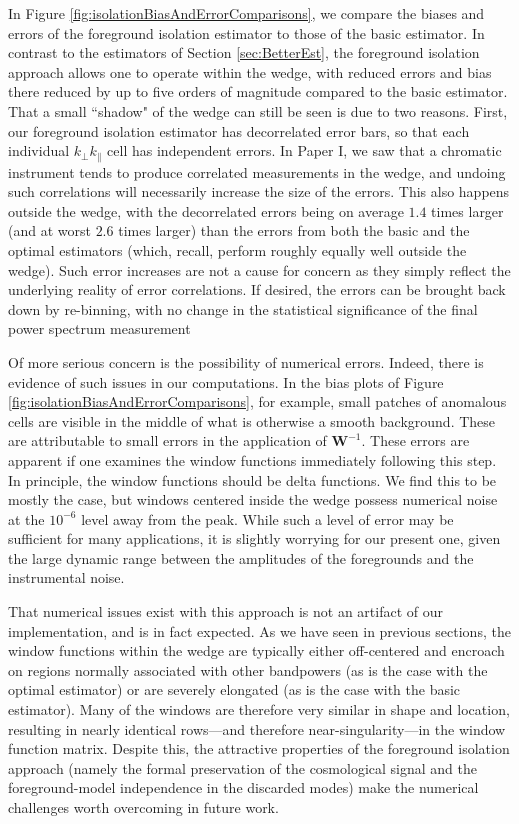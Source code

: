 \documentclass[twocolumn,aps,prd,nofootinbib,showpacs]{revtex4-1}
\begin{document}
In Figure \ref{fig:isolationBiasAndErrorComparisons}, we compare the biases and errors of the foreground isolation estimator to those of the basic estimator.  In contrast to the estimators of Section \ref{sec:BetterEst}, the foreground isolation approach allows one to operate within the wedge, with reduced errors and bias there reduced by up to five orders of magnitude compared to the basic estimator.  That a small ``shadow" of the wedge can still be seen is due to two reasons.  First, our foreground isolation estimator has decorrelated error bars, so that each individual $k_\perp k_\parallel$ cell has independent errors.  In Paper I, we saw that a chromatic instrument tends to produce correlated measurements in the wedge, and undoing such correlations will necessarily increase the size of the errors.  This also happens outside the wedge, with the decorrelated errors being on average $1.4$ times larger (and at worst $2.6$ times larger) than the errors from both the basic and the optimal estimators (which, recall, perform roughly equally well outside the wedge).  Such error increases are not a cause for concern as they simply reflect the underlying reality of error correlations.  If desired, the errors can be brought back down by re-binning, with no change in the statistical significance of the final power spectrum measurement

Of more serious concern is the possibility of numerical errors.  Indeed, there is evidence of such issues in our computations.  In the bias plots of Figure \ref{fig:isolationBiasAndErrorComparisons}, for example, small patches of anomalous cells are visible in the middle of what is otherwise a smooth background.  These are attributable to small errors in the application of $\mathbf{W}^{-1}$.  These errors are apparent if one examines the window functions immediately following this step.  In principle, the window functions should be delta functions.  We find this to be mostly the case, but windows centered inside the wedge possess numerical noise at the $10^{-6}$ level away from the peak.  While such a level of error may be sufficient for many applications, it is slightly worrying for our present one, given the large dynamic range between the amplitudes of the foregrounds and the instrumental noise.

That numerical issues exist with this approach is not an artifact of our implementation, and is in fact expected.  As we have seen in previous sections, the window functions within the wedge are typically either off-centered and encroach on regions normally associated with other bandpowers (as is the case with the optimal estimator) or are severely elongated (as is the case with the basic estimator).  Many of the windows are therefore very similar in shape and location, resulting in nearly identical rows---and therefore near-singularity---in the window function matrix.  Despite this, the attractive properties of the foreground isolation approach (namely the formal preservation of the cosmological signal and the foreground-model independence in the discarded modes) make the numerical challenges worth overcoming in future work.
\end{document}
